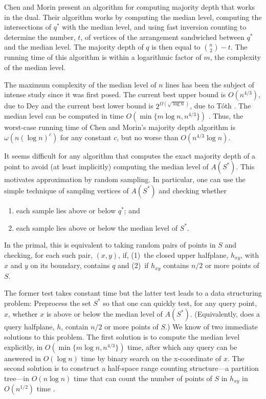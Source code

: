 \documentclass{patmorin}
\begin{document}
Chen and Morin \cite{cm11} present an algorithm for computing majority
depth that works in the dual.  Their algorithm works by computing the
median level, computing the intersections of $q^*$ with the median
level, and using fast inversion counting to determine the number, $t$,
of vertices of the arrangement sandwiched between $q^*$ and the median
level.  The majority depth of $q$ is then equal to $\binom{n}{2}-t$.
The running time of this algorithm is within a logarithmic factor of $m$,
the complexity of the median level.

The maximum complexity of the median level of $n$ lines has been the
subject of intense study since it was first posed.  The current best
upper bound is $O(n^{4/3})$, due to Dey \cite{d98} and the current best
lower bound is $2^{\Omega(\sqrt{\log n})}$, due to T\'oth \cite{t00}.
The median level can be computed in time $O(\min\{m\log n,n^{4/3}\})$
\cite{bj02,c99}.  Thus, the worst-case running time of Chen and Morin's
majority depth algorithm is $\omega(n(\log n)^c)$ for any constant $c$,
but no worse than $O(n^{4/3}\log n)$.

It seems difficult for any algorithm that computes the exact majority
depth of a point to avoid (at least implicitly) computing the median
level of $A(S^*)$.  This motivates approximation by random sampling.
In particular, one can use the simple technique of sampling vertices of
$A(S^*)$ and checking whether
\begin{enumerate}
  \item each sample lies above or below $q^*$; and
  \item each sample lies above or below the median level of $S^*$.
\end{enumerate}
In the primal, this is equivalent to taking random pairs of points in
$S$ and checking, for each such pair, $(x,y)$, if, (1)~the closed
upper halfplane, $h_{xy}$, with $x$ and $y$ on its boundary, contains $q$
and (2)~if $h_{xy}$ contains
 $n/2$ or more points of $S$.

The former test takes constant time but the latter test leads to a
data structuring problem:  Preprocess the set $S^*$ so that one can
quickly test, for any query point, $x$, whether $x$ is above or below
the median level of $A(S^*)$.  (Equivalently, does a query halfplane, $h$,
contain $n/2$ or more points of $S$.)  We know of two immediate solutions
to this problem.  The first solution is to compute the median level
explicitly, in $O(\min\{m\log n,n^{4/3}\})$ time, after which any query
can be answered in $O(\log n)$ time by binary search on the x-coordinate
of $x$.  The second solution is to construct a half-space range counting
structure---a partition tree---in $O(n\log n)$ time that can count the
number of points of $S$ in $h_{xy}$ in $O(n^{1/2})$ time \cite{c12}.
\end{document}
